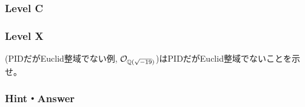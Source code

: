 \subsubsection{Level C}

\subsubsection{Level X}
\begin{prob} (PIDだがEuclid整域でない例, $\mathcal{O}_{\mathbb{Q}(\sqrt{-19})}$)はPIDだがEuclid整域でないことを示せ。
\end{prob}




\subsubsection{Hint・Answer}
